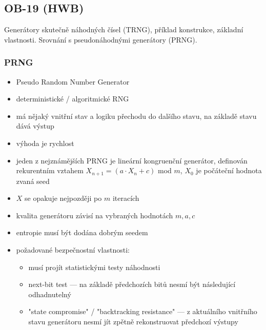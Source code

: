 \subsection{OB-19 (HWB)}
Generátory skutečně náhodných čísel (TRNG), příklad konstrukce, základní vlastnosti. Srovnání s pseudo\-ná\-hod\-ný\-mi generátory (PRNG).


\subsubsection*{PRNG}
\begin{itemize}
	\item Pseudo Random Number Generator
	\item deterministické / algoritmické RNG
	\item má nějaký vnitřní stav a logiku přechodu do dalšího stavu, na základě stavu dává výstup
	\item výhoda je rychlost
	\item jeden z nejznámějších PRNG je lineární kongruenční generátor, definován rekurentním vztahem $X_{n + 1} = (a \cdot X_n + c)$ mod $m$, $X_0$ je počáteční hodnota zvaná seed
	\item $X$ se opakuje nejpozději po $m$ iteracích
	\item kvalita generátoru závisí na vybraných hodnotách $m, a, c$
	\item entropie musí být dodána dobrým seedem
	\item požadované bezpečnostní vlastnosti:
	\begin{itemize}
		\item  musí projít statistickými testy náhodnosti
		\item next-bit test --- na základě předchozích bitů nesmí být následující odhadnutelný
		\item "state compromise" / "backtracking resistance" --- z aktuálního vnitřního stavu generátoru nesmí jít zpětně rekonstruovat předchozí výstupy
	\end{itemize}
\end{itemize}

